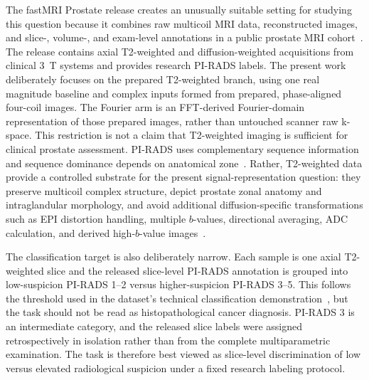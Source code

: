 The fastMRI Prostate release creates an unusually suitable setting for studying this question because it combines raw multicoil MRI data, reconstructed images, and slice-, volume-, and exam-level annotations in a public prostate MRI cohort~\cite{Tibrewala2024FastMRIProstate}. The release contains axial T2-weighted and diffusion-weighted acquisitions from clinical 3~T systems and provides research PI-RADS labels. The present work deliberately focuses on the prepared T2-weighted branch, using one real magnitude baseline and complex inputs formed from prepared, phase-aligned four-coil images. The Fourier arm is an FFT-derived Fourier-domain representation of those prepared images, rather than untouched scanner raw k-space. This restriction is not a claim that T2-weighted imaging is sufficient for clinical prostate assessment. PI-RADS uses complementary sequence information and sequence dominance depends on anatomical zone~\cite{Turkbey2019PIRADSv21}. Rather, T2-weighted data provide a controlled substrate for the present signal-representation question: they preserve multicoil complex structure, depict prostate zonal anatomy and intraglandular morphology, and avoid additional diffusion-specific transformations such as EPI distortion handling, multiple $b$-values, directional averaging, ADC calculation, and derived high-$b$-value images~\cite{Tibrewala2024FastMRIProstate}.

The classification target is also deliberately narrow. Each sample is one axial T2-weighted slice and the released slice-level PI-RADS annotation is grouped into low-suspicion PI-RADS 1--2 versus higher-suspicion PI-RADS 3--5. This follows the threshold used in the dataset's technical classification demonstration~\cite{Tibrewala2024FastMRIProstate}, but the task should not be read as histopathological cancer diagnosis. PI-RADS 3 is an intermediate category, and the released slice labels were assigned retrospectively in isolation rather than from the complete multiparametric examination. The task is therefore best viewed as slice-level discrimination of low versus elevated radiological suspicion under a fixed research labeling protocol.

